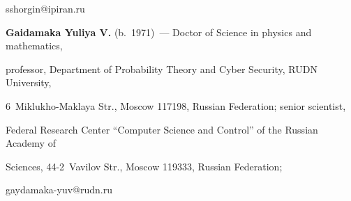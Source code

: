 \mbox{sshorgin@ipiran.ru}





\vspace*{3pt}



\noindent

\textbf{Gaidamaka Yuliya V.} (b.\ 1971)~--- Doctor of Science in physics and mathematics, 

professor, Department of Probability Theory and Cyber Security, RUDN University, 

6~Miklukho-Maklaya Str., Moscow 117198, Russian Federation; senior scientist, 

Federal Research Center ``Computer Science and Control'' of the Russian Academy of 

Sciences, 44-2~Vavilov Str., Moscow 119333, Russian Federation;  

\mbox{gaydamaka-yuv@rudn.ru}



\label{end\stat}



\renewcommand{\bibname}{\protect\rm Литература}

